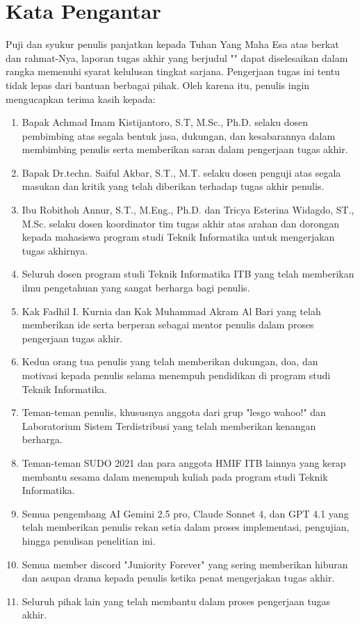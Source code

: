 \chapter*{Kata Pengantar}

Puji dan syukur penulis panjatkan kepada Tuhan Yang Maha Esa atas berkat dan rahmat-Nya, laporan tugas akhir yang berjudul "\thetitle" dapat diselesaikan dalam rangka memenuhi syarat kelulusan tingkat sarjana. Pengerjaan tugas ini tentu tidak lepas dari bantuan berbagai pihak. Oleh karena itu, penulis ingin mengucapkan terima kasih kepada:

\begin{enumerate}
  \item Bapak Achmad Imam Kistijantoro, S.T, M.Sc., Ph.D. selaku dosen pembimbing atas segala bentuk jasa, dukungan, dan kesabarannya dalam membimbing penulis serta memberikan saran dalam pengerjaan tugas akhir.
  \item Bapak Dr.techn. Saiful Akbar, S.T., M.T. selaku dosen penguji atas segala masukan dan kritik yang telah diberikan terhadap tugas akhir penulis.
  \item Ibu Robithoh Annur, S.T., M.Eng., Ph.D. dan Tricya Esterina Widagdo, ST., M.Sc. selaku dosen koordinator tim tugas akhir atas arahan dan dorongan kepada mahasiswa program studi Teknik Informatika untuk mengerjakan tugas akhirnya.
  \item Seluruh dosen program studi Teknik Informatika ITB yang telah memberikan ilmu pengetahuan yang sangat berharga bagi penulis.
  \item Kak Fadhil I. Kurnia dan Kak Muhammad Akram Al Bari yang telah memberikan ide serta berperan sebagai mentor penulis dalam proses pengerjaan tugas akhir.
  \item Kedua orang tua penulis yang telah memberikan dukungan, doa, dan motivasi kepada penulis selama menempuh pendidikan di program studi Teknik Informatika.
  \item Teman-teman penulis, khususnya anggota dari grup "lesgo wahoo!" dan Laboratorium Sistem Terdistribusi yang telah memberikan kenangan berharga.
  \item Teman-teman SUDO 2021 dan para anggota HMIF ITB lainnya yang kerap membantu sesama dalam menempuh kuliah pada program studi Teknik Informatika.
  \item Semua pengembang AI Gemini 2.5 pro, Claude Sonnet 4, dan GPT 4.1 yang telah memberikan penulis rekan setia dalam proses implementasi, pengujian, hingga penulisan penelitian ini.
  \item Semua member discord "Juniority Forever" yang sering memberikan hiburan dan asupan drama kepada penulis ketika penat mengerjakan tugas akhir.
  \item Seluruh pihak lain yang telah membantu dalam proses pengerjaan tugas akhir.
\end{enumerate}

